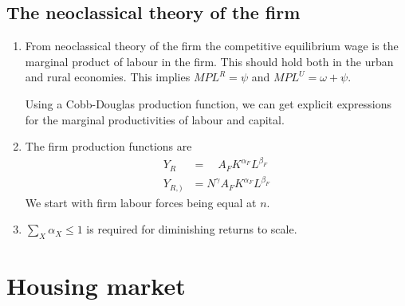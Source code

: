 \subsection{The neoclassical theory of the firm}
\begin{enumerate}
    \item From neoclassical theory of the firm the competitive equilibrium wage is the  marginal product of labour in the firm.      This should hold both in the urban and rural economies. This implies       $ MPL^R=\psi$  and $ MPL^U=\omega+\psi $.

    Using a Cobb-Douglas production function, we can get explicit expressions for the marginal productivities of labour and capital. 
\item The firm production functions are 
\begin{align}
Y_R  &= \quad  A_FK^{\alpha_F}L^{\beta_F}\\
Y_{R, )} &= N^\gamma A_FK^{\alpha_F}L^{\beta_F}
\end{align}
We start with firm labour forces  being equal at $n$.

\item $\sum_X \alpha_X \le 1$ is required for diminishing returns to scale. 

\end{enumerate}


\section{Housing market}


 

